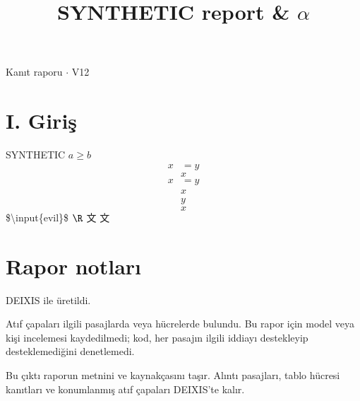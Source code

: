 \documentclass[journal]{IEEEtran}
\begin{document}
\renewcommand{\abstractname}{Özet}
\renewcommand{\IEEEkeywordsname}{Dizin Terimleri}
\renewcommand{\refname}{Kaynaklar}

\title{SYNTHETIC report \& \ensuremath{\alpha}}

\maketitle

\noindent Kanıt raporu \ensuremath{\cdot} V12

\section*{I. Giriş}

SYNTHETIC $a\geq b$
\begin{align}x&=y\end{align}
\begin{equation*}
x\tag{z}
\end{equation*}
\begin{equation*}
\begin{aligned}
x&=y
\end{aligned}
\end{equation*}
\begin{equation*}
\begin{gathered}
x\\y
\end{gathered}
\end{equation*}
\begin{equation*}
x
\end{equation*}
\$\textbackslash{}input\{evil\}\$ $\R$ 文 $文$ \cite{Synth26}

\section*{Rapor notları}

DEIXIS ile üretildi.

Atıf çapaları ilgili pasajlarda veya hücrelerde bulundu. Bu rapor için model veya kişi incelemesi kaydedilmedi; kod, her pasajın ilgili iddiayı destekleyip desteklemediğini denetlemedi.

Bu çıktı raporun metnini ve kaynakçasını taşır. Alıntı pasajları, tablo hücresi kanıtları ve konumlanmış atıf çapaları DEIXIS'te kalır.




\end{document}
